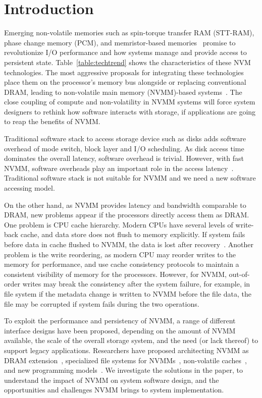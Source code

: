 \section{Introduction}
\label{sec:introduction}

Emerging non-volatile memories such as spin-torque transfer RAM (STT-RAM),
phase change memory (PCM), and
memristor-based memories~\cite{moneta, monetad, quicksan,Onyx,
pollisbetterthaninterrupt}
promise to revolutionize I/O performance and how
systems manage and provide access to persistent state.
Table~\ref{table:techtrend}
shows the characteristics of these NVM technologies. The most aggressive
proposals for integrating these technologies place them on the processor's
memory bus alongside or replacing conventional DRAM, leading to non-volatile
main memory (NVMM)-based systems~\cite{PCM_EfficientMainMemory,
PCMHierarchy,eNVy,WSP,LeeISCA09}. The close coupling of compute and
non-volatility in NVMM systems will force system designers to rethink how
software interacts with storage, if applications are going to reap the benefits of NVMM.

Traditional software stack to access storage device such as disks
adds software overhead of mode switch, block layer and I/O scheduling.
As disk access time dominates the overall latency, software overhead is trivial.
However, with fast NVMM, software overheads play an important role
in the access latency~\cite{monetad,BankShot}. Traditional software
stack is not suitable for NVMM and we need a new software accessing model.

On the other hand, as NVMM provides latency and bandwidth comparable to DRAM,
new problems
appear if the processors directly access them as DRAM. One problem is 
CPU cache hierarchy. Modern CPUs have several levels of write-back cache,
 and data store does not flush to memory explicitly. If system fails before
data in cache flushed to NVMM, the data is lost after
recovery~\cite{CPUcaching}. Another
problem is the write reordering, as modern CPU may reorder writes to the
memory for performance, and use cache consistency protocols to maintain
a consistent visibility of memory for the processors. However, for NVMM,
out-of-order writes may break the consistency after the system failure,
for example, in file system if the metadata change is written to NVMM before
the file data, the file may be corrupted if system fails during the two 
operations. 

To exploit the performance and persistency of NVMM,
a range of different interface designs have been proposed,
depending on the amount of
NVMM available, the scale of the overall storage system, and the need (or lack
thereof) to support legacy applications.  Researchers have proposed architecting
NVMM as DRAM extension~\cite{pdram, memorage, duet}, specialized
file systems for NVMMs~\cite{PMFS,BPFS}, non-volatile
caches~\cite{RVM,riofilecache,riovista}, and new programming
models~\cite{nvheaps,mnemosyne}. We investigate the solutions in the paper, to
understand the impact of NVMM on system software design, and the opportunities
and challenges NVMM brings to system implementation.

